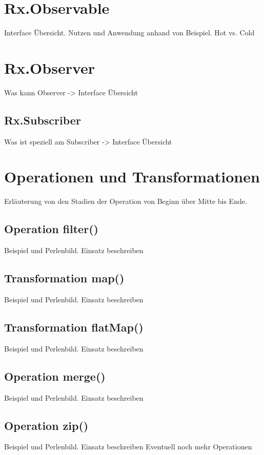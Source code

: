 \section{Rx.Observable}
Interface Übersicht. Nutzen und Anwendung anhand von Beispiel. Hot vs. Cold
\section{Rx.Observer}
Was kann Observer -> Interface Übersicht
\subsection{Rx.Subscriber}
Was ist speziell am Subscriber -> Interface Übersicht
\section{Operationen und Transformationen}
Erläuterung von den Stadien der Operation von Beginn über Mitte bis Ende.
\subsection{Operation filter()}
Beispiel und Perlenbild. Einsatz beschreiben
\subsection{Transformation map()}
Beispiel und Perlenbild. Einsatz beschreiben
\subsection{Transformation flatMap()}
Beispiel und Perlenbild. Einsatz beschreiben
\subsection{Operation merge()}
Beispiel und Perlenbild. Einsatz beschreiben
\subsection{Operation zip()}
Beispiel und Perlenbild. Einsatz beschreiben
Eventuell noch mehr Operationen


